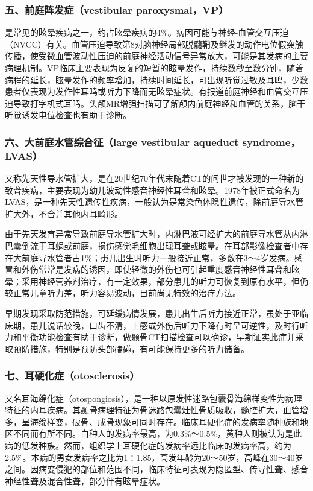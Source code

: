 \subsubsection{五、前庭阵发症（vestibular paroxysmal，VP）}

是常见的眩晕疾病之一，约占眩晕疾病的4\%。病因可能与神经-血管交互压迫（NVCC）有关。血管压迫导致第8对脑神经局部脱髓鞘及继发的动作电位假突触传播，使受微血管波动性压迫的前庭神经活动信号异常放大，可能是其发病的主要病理机制。VP临床主要表现为反复的短暂的眩晕发作，持续数秒至数分钟，随着病程的延长，眩晕发作的频率增加，持续时间延长，可出现听觉过敏及耳鸣，少数患者仅表现为发作性耳鸣或听力下降而无眩晕症状。有报道前庭神经和血管交互压迫导致打字机式耳鸣。头颅MR增强扫描可了解颅内前庭神经和血管的关系，脑干听觉诱发电位检查也有助于诊断。

\subsubsection{六、大前庭水管综合征（large vestibular aqueduct syndrome，LVAS）}

又称先天性导水管扩大，是在20世纪70年代末随着CT的问世才被发现的一种新的致聋疾病，主要表现为幼儿波动性感音神经性耳聋和眩晕。1978年被正式命名为LVAS，是一种先天性遗传性疾病，一般认为是常染色体隐性遗传，除前庭导水管扩大外，不合并其他内耳畸形。

由于先天发育异常导致前庭导水管扩大时，内淋巴液可经扩大的前庭导水管从内淋巴囊倒流于耳蜗或前庭，损伤感觉毛细胞出现耳聋或眩晕。在耳部影像检查者中存在大前庭导水管者占1\%；患儿出生时听力一般接近正常，多数在3～4岁发病。感冒和外伤常常是发病的诱因，即使轻微的外伤也可引起重度感音神经性耳聋和眩晕；采用神经营养剂治疗，有一定效果，部分患儿的听力可恢复到原有水平，但仍较正常儿童听力差，听力容易波动，目前尚无特效的治疗方法。

早期发现采取防范措施，可延缓病情发展，患儿出生后听力接近正常，虽处于亚临床期，患儿说话较晚，口齿不清，上感或外伤后听力下降有时呈可逆性，及时行听力和平衡功能检查有助于诊断，做颞骨CT扫描检查可以确诊，早期证实此症并采取预防措施，特别是预防头部磕碰，有可能保持更多的听力储备。

\subsubsection{七、耳硬化症（otosclerosis）}

又名耳海绵化症（otospongiosis），是一种以原发性迷路包囊骨海绵样变性为病理特征的内耳疾病。其颞骨病理特征为骨迷路包囊灶性骨质吸收，髓腔扩大，血管增多，呈海绵样变，破骨、成骨现象可同时存在。临床耳硬化症的发病率随种族和地区不同而有所不同。白种人的发病率最高，为0.3\%～0.5\%，黄种人则被认为是此病的低发种族。然而，组织学上耳硬化症的发病率远比临床的发病率高，约为2.5\%。本病的男女发病率之比为1∶1.85，高发年龄为20～50岁，高峰在30～40岁之间。因病变侵犯的部位和范围不同，临床特征可表现为隐匿型、传导性聋、感音神经性聋及混合性聋，部分伴有眩晕症状。

